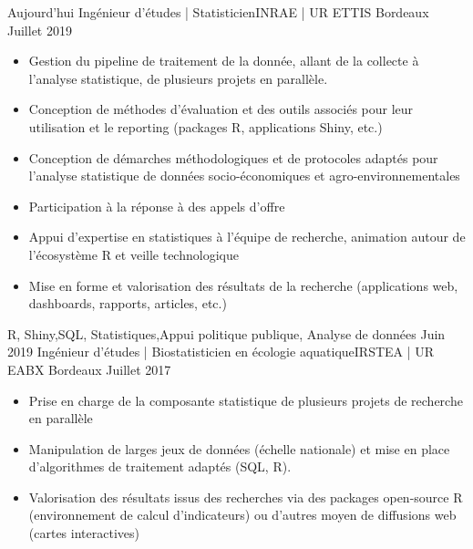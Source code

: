 \documentclass[localFont,alternative]{yaac-another-awesome-cv}
\begin{document}
\begin{experiences}
\experience
    {Aujourd'hui}   {Ingénieur d'études | Statisticien}{INRAE | UR ETTIS }{Bordeaux}
    {Juillet 2019} {
                      \begin{itemize}                    
                        \item Gestion du pipeline de traitement de la donnée, allant de la collecte à l'analyse statistique, de plusieurs projets en parallèle.
                        \item Conception de méthodes d'évaluation et des outils associés pour leur utilisation et le reporting (packages R, applications Shiny, etc.)
                        \item Conception de démarches méthodologiques et de protocoles adaptés pour l’analyse statistique de données socio-économiques et agro-environnementales
                        \item Participation à la réponse à des appels d’offre
                        \item Appui d'expertise en statistiques à l'équipe de recherche, animation autour de l'écosystème R et veille technologique                                                                         
                        \item Mise en forme et valorisation des résultats de la recherche (applications web, dashboards, rapports, articles, etc.)
                      \end{itemize}
                    }
                    {R, Shiny,SQL, Statistiques,Appui politique publique, Analyse de données}
  \emptySeparator
  \experience
    {Juin 2019}   {Ingénieur d'études | Biostatisticien en écologie aquatique}{IRSTEA | UR EABX }{Bordeaux}
    {Juillet 2017} {
                      \begin{itemize}                    
                        \item Prise en charge de la composante statistique de plusieurs projets de recherche en parallèle
                        \item Manipulation de larges jeux de données (échelle nationale) et mise en place d'algorithmes de traitement adaptés (SQL, R).
                        \item Valorisation des résultats issus des recherches via des packages open-source R (environnement de calcul d'indicateurs) ou d'autres moyen de diffusions web (cartes interactives)

\end{itemize}}
\end{experiences}
\end{document}
